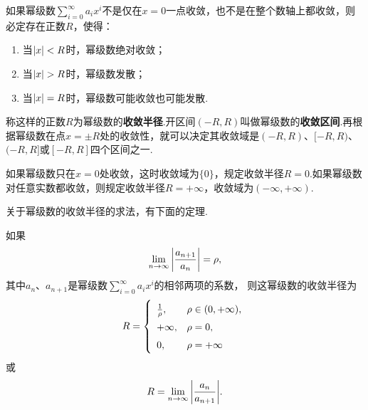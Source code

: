 \begin{corollary}\label{theorem:无穷级数.阿贝尔定理推论}
如果幂级数\(\sum\limits_{i=0}^{\infty} a_i x^i\)不是仅在\(x=0\)一点收敛，也不是在整个数轴上都收敛，则必定存在正数\(R\)，使得：\begin{enumerate}
\item 当\(\abs{x}<R\)时，幂级数绝对收敛；
\item 当\(\abs{x}>R\)时，幂级数发散；
\item 当\(\abs{x}=R\)时，幂级数可能收敛也可能发散.
\end{enumerate}
\rm
称这样的正数\(R\)为幂级数的\textbf{收敛半径}.开区间\((-R,R)\)叫做幂级数的\textbf{收敛区间}.再根据幂级数在点\(x = \pm R\)处的收敛性，就可以决定其收敛域是\((-R,R)\)、\([-R,R)\)、\((-R,R]\)或\([-R,R]\)四个区间之一.

如果幂级数只在\(x=0\)处收敛，这时收敛域为\(\{0\}\)，规定收敛半径\(R=0\).如果幂级数对任意实数都收敛，则规定收敛半径\(R=+\infty\)，收敛域为\((-\infty,+\infty)\).
\end{corollary}

关于幂级数的收敛半径的求法，有下面的定理.
\begin{theorem}\label{theorem:无穷级数.幂级数的收敛半径的求法}
如果\[
\lim\limits_{n\to\infty} \abs{\frac{a_{n+1}}{a_n}} = \rho,
\]其中\(a_n\)、\(a_{n+1}\)是幂级数\(\sum\limits_{i=0}^{\infty}{a_i x^i}\)的相邻两项的系数，%
则这幂级数的收敛半径为\[
\def\arraystretch{1.5}
R = \left\{ \begin{array}{ll}
\frac{1}{\rho}, & \rho \in (0,+\infty), \\
+\infty, & \rho = 0, \\
0, & \rho = +\infty \\
\end{array} \right.
\]或\[
R = \lim\limits_{n\to\infty} {\abs{\frac{a_n}{a_{n+1}}}}.
\]
\end{theorem}


